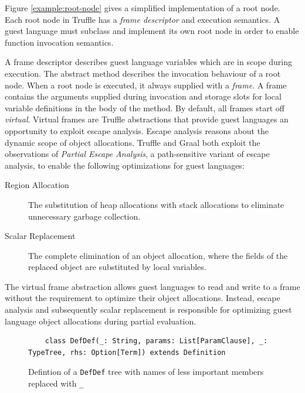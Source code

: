 Figure \ref{example:root-node} gives a simplified implementation of a root node.
Each root node in Truffle has a \textit{frame descriptor} and execution semantics.
A guest language must subclass and implement its own root node in order to enable function invocation semantics.

A frame descriptor describes guest language variables which are in scope during execution.
The abstract  method describes the invocation behaviour of a root node.
When a root node is executed, it always supplied with a \textit{frame}.
A frame contains the arguments supplied during invocation and storage slots for local variable definitions in the body of the method.
By default, all frames start off \textit{virtual}.
Virtual frames are Truffle abstractions that provide guest languages an opportunity to exploit escape analysis.
Escape analysis\cite{escape-analysis} reasons about the dynamic scope of object allocations. 
Truffle and Graal both exploit the observations of \textit{Partial Escape Analysis}\cite{java:partial-escape-analysis}, a path-sensitive variant of escape analysis, to enable the following optimizations for guest languages:

\begin{description}
	\item[Region Allocation\cite{java:escape-analysis}\cite{tofte:region-memory}] The substitution of heap allocations with stack allocations to eliminate unnecessary garbage collection.
	\item[Scalar Replacement\cite{java:escape-analysis-optimizations}] The complete elimination of an object allocation, where the fields of the replaced object are substituted by local variables.
\end{description}

The virtual frame abstraction allows guest languages to read and write to a frame without the requirement to optimize their object allocations.
Instead, escape analysis and subsequently scalar replacement is responsible for optimizing guest language object allocations during partial evaluation. 

\begin{figure}[!htb]
	\begin{verbatim}
	class DefDef(_: String, params: List[ParamClause], _: TypeTree, rhs: Option[Term]) extends Definition	
	\end{verbatim}
	\caption{Defintion of a \texttt{DefDef} tree with names of less important members replaced with \texttt{\_}}
	\label{recall:defdef}
\end{figure}

